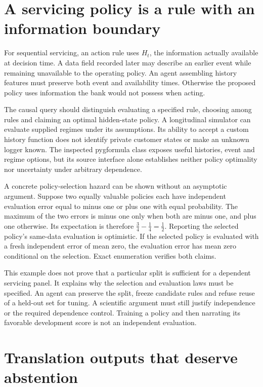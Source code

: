 \section{A servicing policy is a rule with an information boundary}

For sequential servicing, an action rule uses $H_t$, the information actually
available at decision time. A data field recorded later may describe an earlier
event while remaining unavailable to the operating policy. An agent assembling
history features must preserve both event and availability times. Otherwise
the proposed policy uses information the bank would not possess when acting.

The causal query should distinguish evaluating a specified rule, choosing among
rules and claiming an optimal hidden-state policy. A longitudinal simulator can
evaluate supplied regimes under its assumptions. Its ability to accept a custom
history function does not identify private customer states or make an unknown
logger known. The inspected pygformula class exposes useful histories, event
and regime options, but its source interface alone establishes neither policy
optimality nor uncertainty under arbitrary dependence. \citep{v13_sw_pygformula}

A concrete policy-selection hazard can be shown without an asymptotic argument.
Suppose two equally valuable policies each have independent evaluation error
equal to minus one or plus one with equal probability. The maximum of the two
errors is minus one only when both are minus one, and plus one otherwise.
Its expectation is therefore $\tfrac34-\tfrac14=\tfrac12$. Reporting the
selected policy's same-data evaluation is optimistic. If the selected policy
is evaluated with a fresh independent error of mean zero, the evaluation error
has mean zero conditional on the selection. Exact enumeration verifies both
claims. \citep{v13_project_exact}

This example does not prove that a particular split is sufficient for a
dependent servicing panel. It explains why the selection and evaluation laws
must be specified. An agent can preserve the split, freeze candidate rules and
refuse reuse of a held-out set for tuning. A scientific argument must still
justify independence or the required dependence control. Training a policy
and then narrating its favorable development score is not an independent
evaluation.

\section{Translation outputs that deserve abstention}

